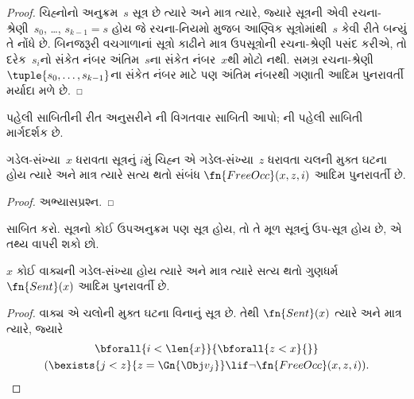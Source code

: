 \begin{proof}
ચિહ્નોનો અનુક્રમ~$s$ સૂત્ર છે
ત્યારે અને માત્ર ત્યારે, જ્યારે
સૂત્રની એવી રચના-શ્રેણી~$s_0$,
\dots, $s_{k-1} = s$ હોય જે રચના-નિયમો
મુજબ આણ્વિક સૂત્રોમાંથી~$s$
કેવી રીતે બન્યું તે નોંધે છે. બિનજરૂરી
વચગાળાનાં સૂત્રો કાઢીને માત્ર ઉપસૂત્રોની
રચના-શ્રેણી પસંદ કરીએ, તો દરેક~$s_i$નો
સંકેત નંબર અંતિમ~$s$ના સંકેત નંબર~$x$થી
મોટો નથી. સમગ્ર રચના-શ્રેણી
$\tuple{s_0, \dots, s_{k-1}}$ના સંકેત
નંબર માટે પણ અંતિમ નંબરથી ગણાતી
આદિમ પુનરાવર્તી મર્યાદા મળે છે.
\end{proof}

\begin{prob}
પહેલી સાબિતીની રીત અનુસરીને
ની
વિગતવાર સાબિતી આપો;
ની
પહેલી સાબિતી માર્ગદર્શક છે.
\end{prob}

\begin{prop}
ગડેલ-સંખ્યા~$x$ ધરાવતા સૂત્રનું
$i$મું ચિહ્ન એ ગડેલ-સંખ્યા~$z$
ધરાવતા ચલની મુક્ત ઘટના હોય ત્યારે
અને માત્ર ત્યારે સત્ય થતો સંબંધ
$\fn{FreeOcc}(x, z, i)$ આદિમ
પુનરાવર્તી છે.
\end{prop}

\begin{proof}
અભ્યાસપ્રશ્ન.
\end{proof}

\begin{prob}
સાબિત કરો. સૂત્રનો કોઈ
ઉપઅનુક્રમ પણ સૂત્ર હોય, તો
તે મૂળ સૂત્રનું ઉપ-સૂત્ર હોય છે,
એ તથ્ય વાપરી શકો છો.
\end{prob}

\begin{prop}
$x$ કોઈ વાક્યની ગડેલ-સંખ્યા
હોય ત્યારે અને માત્ર ત્યારે સત્ય થતો
ગુણધર્મ~$\fn{Sent}(x)$ આદિમ
પુનરાવર્તી છે.
\end{prop}

\begin{proof}
વાક્ય એ ચલોની મુક્ત
ઘટના વિનાનું સૂત્ર છે. તેથી
$\fn{Sent}(x)$ ત્યારે અને માત્ર ત્યારે,
જ્યારે
\begin{multline*}
\bforall{i<\len{x}}{\bforall{z<x}{}}\\
(\bexists{j<z}{z=\Gn{\Obj v_j}} \lif \lnot\fn{FreeOcc}(x,z,i)).
\end{multline*}
\end{proof}
\endgroup



